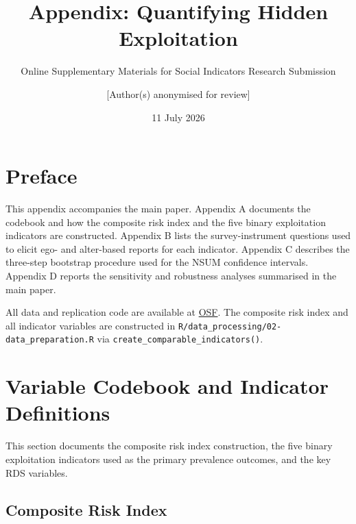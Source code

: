 \documentclass[
  12pt,
  letterpaper,
  DIV=11,
  numbers=noendperiod]{scrreprt}
\title{Appendix: Quantifying Hidden Exploitation}
\subtitle{Online Supplementary Materials for Social Indicators Research
Submission}
\author{{[}Author(s) anonymised for review{]}}
\date{11 July 2026}
\renewcommand*\contentsname{Table of contents}
\newcommand\contentsname{Table of contents}
\begin{document}
\maketitle

\renewcommand*\contentsname{Table of contents}
{
\hypersetup{linkcolor=}
\setcounter{tocdepth}{2}
\tableofcontents
}


\chapter*{Preface}\label{preface}


This appendix accompanies the main paper. Appendix A documents the
codebook and how the composite risk index and the five binary
exploitation indicators are constructed. Appendix B lists the
survey-instrument questions used to elicit ego- and alter-based reports
for each indicator. Appendix C describes the three-step bootstrap
procedure used for the NSUM confidence intervals. Appendix D reports the
sensitivity and robustness analyses summarised in the main paper.

All data and replication code are available at
\href{\%5BOSF\%20view-only\%20URL\%20redacted\%20for\%20anonymised\%20review;\%20will\%20be\%20provided\%20upon\%20request\%5D}{OSF}.
The composite risk index and all indicator variables are constructed in
\texttt{R/data\_processing/02-data\_preparation.R} via
\texttt{create\_comparable\_indicators()}.

\cleardoublepage
{}
{}
\appendix

\chapter{Variable Codebook and Indicator Definitions}\label{sec-a}

This section documents the composite risk index construction, the five
binary exploitation indicators used as the primary prevalence outcomes,
and the key RDS variables.

\section{Composite Risk Index}\label{sec-a-composite}
\end{document}
